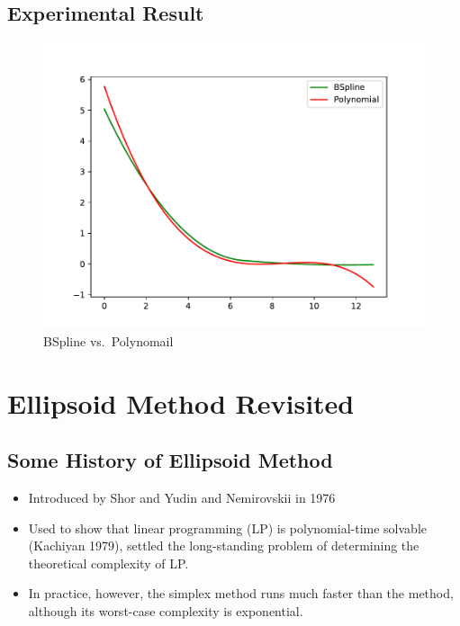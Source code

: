 \documentclass[]{article}
\begin{document}
\hypertarget{experimental-result}{%
\subsection{Experimental Result}\label{experimental-result}}

\begin{figure}
\centering
\includegraphics{ellipsoid.files/corr_fn.pdf}
\caption{BSpline vs.~Polynomail}
\end{figure}

\hypertarget{ellipsoid-method-revisited}{%
\section{Ellipsoid Method Revisited}\label{ellipsoid-method-revisited}}

\hypertarget{some-history-of-ellipsoid-method}{%
\subsection{Some History of Ellipsoid
Method}\label{some-history-of-ellipsoid-method}}

\begin{itemize}
\item
  Introduced by Shor and Yudin and Nemirovskii in 1976
\item
  Used to show that linear programming (LP) is polynomial-time solvable
  (Kachiyan 1979), settled the long-standing problem of determining the
  theoretical complexity of LP.
\item
  In practice, however, the simplex method runs much faster than the
  method, although its worst-case complexity is exponential.
\end{itemize}
\end{document}
